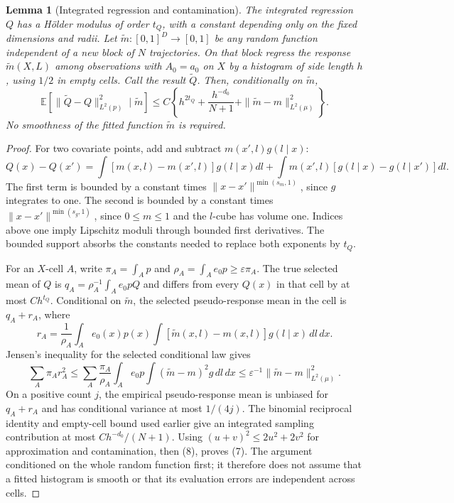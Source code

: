\documentclass[11pt]{article}
\newtheorem{lemma}[theorem]{Lemma}
\theoremstyle{definition}
\begin{document}
\begin{lemma}[Integrated regression and contamination]
The integrated regression $Q$ has a H\"older modulus of
order $t_Q$, with a constant depending only on the fixed dimensions and
radii. Let $\widetilde m:[0,1]^D\to[0,1]$ be any random function
independent of a new block of $N$ trajectories. On that block regress
the response $\widetilde m(X,L)$ among observations with $A_0=a_0$
on $X$ by a histogram of side length $h$, using $1/2$ in empty cells.
Call the result $\widetilde Q$. Then, conditionally on $\widetilde m$,
\[
 \mathbb E[\|\widetilde Q-Q\|_{L^2(p)}^2\mid\widetilde m]
 \le C\left\{h^{2t_Q}+\frac{h^{-d_0}}{N+1}
                    +\|\widetilde m-m\|_{L^2(\mu)}^2\right\}.
                                                               \tag{7}
\]
No smoothness of the fitted function $\widetilde m$ is required.
\end{lemma}
\begin{proof}
For two covariate points, add and subtract $m(x',l)g(l\mid x)$:
\[
 Q(x)-Q(x')=\int[m(x,l)-m(x',l)]g(l\mid x)dl
                +\int m(x',l)[g(l\mid x)-g(l\mid x')]dl.
\]
The first term is bounded by a constant times
$\|x-x'\|^{\min(s_m,1)}$, since $g$ integrates to one.
The second is bounded by a constant times
$\|x-x'\|^{\min(s_g,1)}$, since $0\le m\le1$ and the $l$-cube has
volume one. Indices above one imply Lipschitz moduli through bounded
first derivatives. The bounded support absorbs the constants needed to
replace both exponents by $t_Q$.

For an $X$-cell $A$, write
$\pi_A=\int_Ap$ and $\rho_A=\int_A e_0p\ge\varepsilon\pi_A$.
The true selected mean of $Q$ is
$q_A=\rho_A^{-1}\int_A e_0p Q$ and differs from every $Q(x)$ in that
cell by at most $Ch^{t_Q}$. Conditional on $\widetilde m$, the selected
pseudo-response mean in the cell is $q_A+r_A$, where
\[
 r_A=\frac1{\rho_A}\int_A e_0(x)p(x)
       \int [\widetilde m(x,l)-m(x,l)]g(l\mid x)\,dl\,dx.
\]
Jensen's inequality for the selected conditional law gives
\[
 \sum_A\pi_A r_A^2
 \le\sum_A\frac{\pi_A}{\rho_A}\int_Ae_0p
                       \int(\widetilde m-m)^2g\,dl\,dx
 \le\varepsilon^{-1}\|\widetilde m-m\|_{L^2(\mu)}^2. \tag{8}
\]
On a positive count $j$, the empirical pseudo-response mean is unbiased
for $q_A+r_A$ and has conditional variance at most $1/(4j)$.
The binomial reciprocal identity and empty-cell bound used earlier give
an integrated sampling contribution at most $C h^{-d_0}/(N+1)$.
Using $(u+v)^2\le2u^2+2v^2$ for approximation and contamination,
then (8), proves (7). The argument conditioned on the whole random
function first; it therefore does not assume that a fitted histogram is
smooth or that its evaluation errors are independent across cells.
\end{proof}
\end{document}
